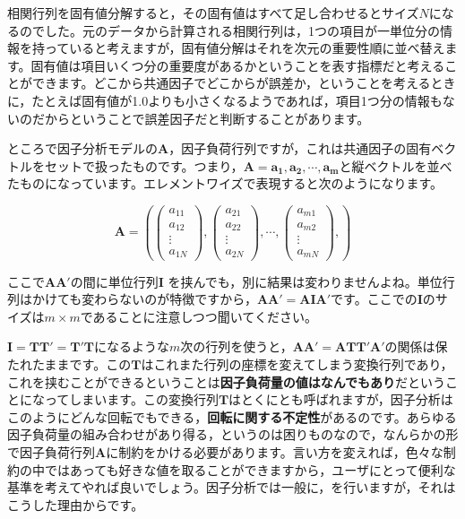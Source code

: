 \documentclass{ltjsbook}
\begin{document}
相関行列を固有値分解すると，その固有値はすべて足し合わせるとサイズ$N$になるのでした。元のデータから計算される相関行列は，1つの項目が一単位分の情報を持っていると考えますが，固有値分解はそれを次元の重要性順に並べ替えます。固有値は項目いくつ分の重要度があるかということを表す指標だと考えることができます。どこから共通因子でどこからが誤差か，ということを考えるときに，たとえば固有値が1.0よりも小さくなるようであれば，項目1つ分の情報もないのだからということで誤差因子だと判断することがあります。

ところで因子分析モデルの$\bm{A}$，因子負荷行列ですが，これは共通因子の固有ベクトルをセットで扱ったものです。つまり，$\bm{A} = \bm{a_1,a_2,\cdots,a_m}$と縦ベクトルを並べたものになっています。エレメントワイズで表現すると次のようになります。

\[
	\bm{A} = \left (
	\begin{pmatrix}  a_{11}\\a_{12}\\\vdots\\ a_{1N} \end{pmatrix},
	\begin{pmatrix}  a_{21}\\a_{22}\\\vdots\\ a_{2N} \end{pmatrix},
	\cdots,
	\begin{pmatrix}  a_{m1}\\a_{m2}\\\vdots\\ a_{mN} \end{pmatrix},
	\right )
\]

ここで$\bm{AA'}$の間に単位行列$\bm{I}$ を挟んでも，別に結果は変わりませんよね。単位行列はかけても変わらないのが特徴ですから，$\bm{AA'}=\bm{AIA'}$です。ここでの$\bm{I}$のサイズは$m \times m$であることに注意しつつ聞いてください。

$\bm{I} = \bm{TT'}=\bm{T'T}$になるような$m$次の行列を使うと，$\bm{AA'} = \bm{ATT'A'}$の関係は保たれたままです。この$\bm{T}$はこれまた行列の座標を変えてしまう変換行列であり，これを挟むことができるということは\textbf{因子負荷量の値はなんでもあり}だということになってしまいます。この変換行列$\bm{T}$はとくにとも呼ばれますが，因子分析はこのようにどんな回転でもできる，\textbf{回転に関する不定性}があるのです。あらゆる因子負荷量の組み合わせがあり得る，というのは困りものなので，なんらかの形で因子負荷行列$\bm{A}$に制約をかける必要があります。言い方を変えれば，色々な制約の中ではあっても好きな値を取ることができますから，ユーザにとって便利な基準を考えてやれば良いでしょう。因子分析では一般に，を行いますが，それはこうした理由からです。
\end{document}
